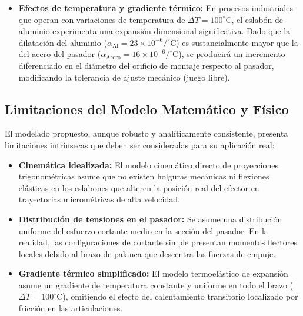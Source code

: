 \documentclass[11pt,a4paper]{article}
\begin{document}
\begin{itemize}
\begin{itemize}
    \end{itemize}
    \item \textbf{Efectos de temperatura y gradiente térmico:}
    En procesos industriales que operan con variaciones de temperatura de $\Delta T = 100^\circ\text{C}$, el eslabón de aluminio experimenta una expansión dimensional significativa. Dado que la dilatación del aluminio ($\alpha_{\text{Al}} = 23 \times 10^{-6}\text{/}^\circ\text{C}$) es sustancialmente mayor que la del acero del pasador ($\alpha_{\text{Acero}} = 16 \times 10^{-6}\text{/}^\circ\text{C}$), se producirá un incremento diferenciado en el diámetro del orificio de montaje respecto al pasador, modificando la tolerancia de ajuste mecánico (juego libre).
\end{itemize}

\subsection{Limitaciones del Modelo Matemático y Físico}
El modelado propuesto, aunque robusto y analíticamente consistente, presenta limitaciones intrínsecas que deben ser consideradas para su aplicación real:
\begin{itemize}
    \item \textbf{Cinemática idealizada:} El modelo cinemático directo de proyecciones trigonométricas asume que no existen holguras mecánicas ni flexiones elásticas en los eslabones que alteren la posición real del efector en trayectorias micrométricas de alta velocidad.
    \item \textbf{Distribución de tensiones en el pasador:} Se asume una distribución uniforme del esfuerzo cortante medio en la sección del pasador. En la realidad, las configuraciones de cortante simple presentan momentos flectores locales debido al brazo de palanca que descentra las fuerzas de empuje.
    \item \textbf{Gradiente térmico simplificado:} El modelo termoelástico de expansión asume un gradiente de temperatura constante y uniforme en todo el brazo ($\Delta T = 100^\circ\text{C}$), omitiendo el efecto del calentamiento transitorio localizado por fricción en las articulaciones.
\end{itemize}

\end{document}

